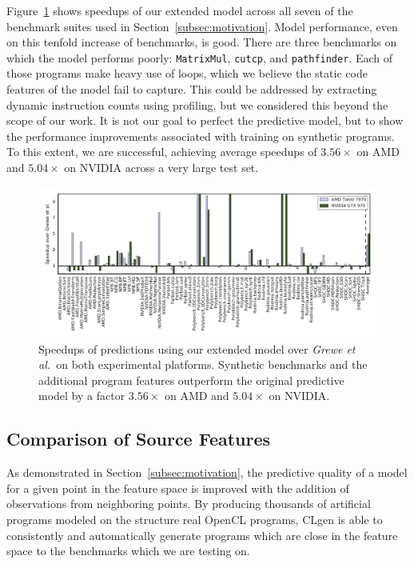 Figure~\ref{fig:ex2} shows speedups of our extended model across all seven of the benchmark suites used in Section~\ref{subsec:motivation}. Model performance, even on this tenfold increase of benchmarks, is good. There are three benchmarks on which the model performs poorly: \texttt{MatrixMul}, \texttt{cutcp}, and \texttt{pathfinder}. Each of those programs make heavy use of loops, which we believe the static code features of the model fail to capture. This could be addressed by extracting dynamic instruction counts using profiling, but we considered this beyond the scope of our work. It is not our goal to perfect the predictive model, but to show the performance improvements associated with training on synthetic programs. To this extent, we are successful, achieving average speedups of $3.56\times$ on AMD and $5.04\times$ on NVIDIA across a very large test set.

\begin{figure}[t]
  \centering%
  \includegraphics[width=1\textwidth]{img/ex2}%
  \caption{Speedups of predictions using our extended model over \emph{Grewe et al.\ }on both experimental platforms. Synthetic benchmarks and the additional program features outperform the original predictive model by a factor $3.56\times$ on AMD and $5.04\times$ on NVIDIA.}%
  \label{fig:ex2}%
\end{figure}

\subsection{Comparison of Source Features}%
\label{subsec:eval-features}

As demonstrated in Section~\ref{subsec:motivation}, the predictive quality of a model for a given point in the feature space is improved with the addition of observations from neighboring points. By producing thousands of artificial programs modeled on the structure real OpenCL programs, CLgen is able to consistently and automatically generate programs which are close in the feature space to the benchmarks which we are testing on.

